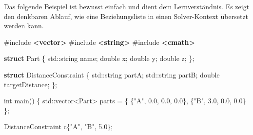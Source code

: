 \documentclass[
  12pt
]{book}
\newenvironment{Shaded}{}{}
\newcommand{\BuiltInTok}[1]{\textcolor[rgb]{0.00,0.50,0.00}{#1}}
\newcommand{\DataTypeTok}[1]{\textcolor[rgb]{0.56,0.13,0.00}{#1}}
\newcommand{\FloatTok}[1]{\textcolor[rgb]{0.25,0.63,0.44}{#1}}
\newcommand{\ImportTok}[1]{\textcolor[rgb]{0.00,0.50,0.00}{\textbf{#1}}}
\newcommand{\KeywordTok}[1]{\textcolor[rgb]{0.00,0.44,0.13}{\textbf{#1}}}
\newcommand{\NormalTok}[1]{#1}
\newcommand{\OperatorTok}[1]{\textcolor[rgb]{0.40,0.40,0.40}{#1}}
\newcommand{\PreprocessorTok}[1]{\textcolor[rgb]{0.74,0.48,0.00}{#1}}
\newcommand{\StringTok}[1]{\textcolor[rgb]{0.25,0.44,0.63}{#1}}
\begin{document}
Das folgende Beispiel ist bewusst einfach und dient dem Lernverständnis.
Es zeigt den denkbaren Ablauf, wie eine Beziehungsliste in einen
Solver-Kontext übersetzt werden kann.

\begin{Shaded}
\begin{Highlighting}[]
\PreprocessorTok{\#include }\ImportTok{\textless{}vector\textgreater{}}
\PreprocessorTok{\#include }\ImportTok{\textless{}string\textgreater{}}
\PreprocessorTok{\#include }\ImportTok{\textless{}cmath\textgreater{}}

\KeywordTok{struct}\NormalTok{ Part }\OperatorTok{\{}
    \BuiltInTok{std::}\NormalTok{string name}\OperatorTok{;}
    \DataTypeTok{double}\NormalTok{ x}\OperatorTok{;}
    \DataTypeTok{double}\NormalTok{ y}\OperatorTok{;}
    \DataTypeTok{double}\NormalTok{ z}\OperatorTok{;}
\OperatorTok{\};}

\KeywordTok{struct}\NormalTok{ DistanceConstraint }\OperatorTok{\{}
    \BuiltInTok{std::}\NormalTok{string partA}\OperatorTok{;}
    \BuiltInTok{std::}\NormalTok{string partB}\OperatorTok{;}
    \DataTypeTok{double}\NormalTok{ targetDistance}\OperatorTok{;}
\OperatorTok{\};}

\DataTypeTok{int}\NormalTok{ main}\OperatorTok{()} \OperatorTok{\{}
    \BuiltInTok{std::}\NormalTok{vector}\OperatorTok{\textless{}}\NormalTok{Part}\OperatorTok{\textgreater{}}\NormalTok{ parts }\OperatorTok{=} \OperatorTok{\{}
        \OperatorTok{\{}\StringTok{"A"}\OperatorTok{,} \FloatTok{0.0}\OperatorTok{,} \FloatTok{0.0}\OperatorTok{,} \FloatTok{0.0}\OperatorTok{\},}
        \OperatorTok{\{}\StringTok{"B"}\OperatorTok{,} \FloatTok{3.0}\OperatorTok{,} \FloatTok{0.0}\OperatorTok{,} \FloatTok{0.0}\OperatorTok{\}}
    \OperatorTok{\};}

\NormalTok{    DistanceConstraint c}\OperatorTok{\{}\StringTok{"A"}\OperatorTok{,} \StringTok{"B"}\OperatorTok{,} \FloatTok{5.0}\OperatorTok{\};}


\end{Highlighting}
\end{Shaded}
\end{document}

